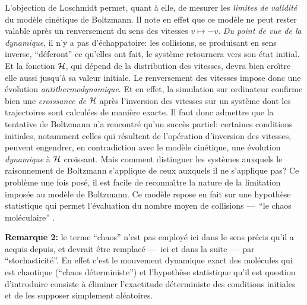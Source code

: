 {\cit L'objection de Loschmidt permet, quant \`a elle, de mesurer
les {\it limites de validit\'e} du mod\`ele cin\'etique de Boltzmann. 
Il note en effet que ce mod\`ele ne peut rester valable apr\`es un 
renversement du sens des vitesses $v \mapsto -v$. {\it Du point de 
vue de la dynamique}, il n'y a pas d'\'echappatoire: les collisions, 
se produisant en sens inverse, ``{d\'eferont}'' ce qu'elles ont fait,
le syst\`eme retournera vers son \'etat initial. Et la fonction 
${\cal H}$, qui d\'epend de la distribution des vitesses, devra bien 
cro{\^\i}tre elle aussi jusqu'\`a sa valeur initiale. Le renversement 
des vitesses impose donc une \'evolution {\it antithermodynamique}. 
Et en effet, la simulation sur ordinateur confirme bien une 
{\it croissance de} ${\cal H}$ apr\`es l'inversion des vitesses sur 
un syst\`eme dont les trajectoires sont calcul\'ees de mani\`ere exacte.
\smallskip
Il faut donc admettre que la tentative de Boltzmann n'a rencontr\'e 
qu'un succ\`es partiel: certaines conditions initiales, notamment 
celles qui r\'esultent de l'op\'eration d'inversion des vitesses, 
peuvent engendrer, en contradiction avec le mod\`ele cin\'etique, 
une \'evolution {\it dynamique} \`a ${\cal H}$ croissant. Mais 
comment distinguer les syst\`emes auxquels le raisonnement de 
Boltzmann s'applique de ceux auxquels il ne s'applique pas? 
\smallskip
Ce probl\`eme une fois pos\'e, il est facile de reconna{\^\i}tre 
la nature de la limitation impos\'ee au mod\`ele de Boltzmann. Ce 
mod\`ele repose en fait sur une hypoth\`ese statistique qui permet 
l'\'evaluation du nombre moyen de collisions ---~``{le chaos
mol\'eculaire}'' . \par }
\medskip
{\bf Remarque 2:} le terme ``chaos'' n'est pas employ\'e ici 
dans le sens pr\'ecis qu'il a acquis depuis, et devrait \^etre remplac\'e 
---~ici et dans la suite~--- par ``stochasticit\'e''. En effet c'est 
le mouvement dynamique exact des mol\'ecules qui est chaotique (``chaos 
d\'eterministe'') et l'hypoth\`ese statistique qu'il est question 
d'introduire consiste \`a \'eliminer l'exactitude d\'eterministe des 
conditions initiales et de les supposer simplement al\'eatoires. 
\medskip
